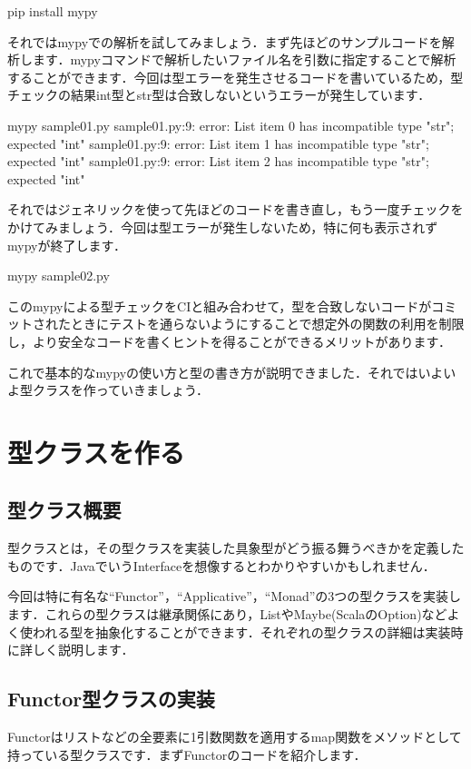\begin{bashcode}
pip install mypy
\end{bashcode}

それではmypyでの解析を試してみましょう．まず先ほどのサンプルコードを解析します．mypyコマンドで解析したいファイル名を引数に指定することで解析することができます．今回は型エラーを発生させるコードを書いているため，型チェックの結果int型とstr型は合致しないというエラーが発生しています．

\begin{bashcode}
mypy sample01.py
sample01.py:9: error: List item 0 has incompatible type "str"; expected "int"
sample01.py:9: error: List item 1 has incompatible type "str"; expected "int"
sample01.py:9: error: List item 2 has incompatible type "str"; expected "int"
\end{bashcode}

それではジェネリックを使って先ほどのコードを書き直し，もう一度チェックをかけてみましょう．今回は型エラーが発生しないため，特に何も表示されずmypyが終了します．


\begin{bashcode}
mypy sample02.py
\end{bashcode}

このmypyによる型チェックをCIと組み合わせて，型を合致しないコードがコミットされたときにテストを通らないようにすることで想定外の関数の利用を制限し，より安全なコードを書くヒントを得ることができるメリットがあります．

これで基本的なmypyの使い方と型の書き方が説明できました．それではいよいよ型クラスを作っていきましょう．

\section{型クラスを作る}
\subsection{型クラス概要}
型クラスとは，その型クラスを実装した具象型がどう振る舞うべきかを定義したものです．JavaでいうInterfaceを想像するとわかりやすいかもしれません．

今回は特に有名な``Functor''，``Applicative''，``Monad''の3つの型クラスを実装します．これらの型クラスは継承関係にあり，ListやMaybe(ScalaのOption)などよく使われる型を抽象化することができます．それぞれの型クラスの詳細は実装時に詳しく説明します．

\subsection{Functor型クラスの実装}
Functorはリストなどの全要素に1引数関数を適用するmap関数をメソッドとして持っている型クラスです．まずFunctorのコードを紹介します．

